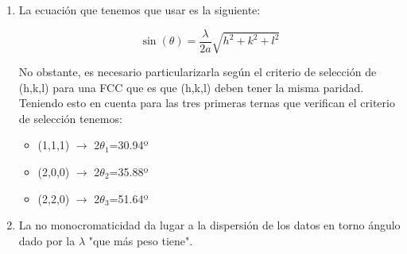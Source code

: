 \begin{enumerate}
	\item La ecuación que tenemos que usar es la siguiente:

	      \begin{equation}
		      \sin(\theta)=\frac{\lambda}{2a}\sqrt{h^2+k^2+l^2}
	      \end{equation}

	      No obstante, es necesario particularizarla según el criterio de selección de (h,k,l) para una FCC que es que (h,k,l) deben tener la misma paridad. Teniendo esto en cuenta para las tres primeras ternas que verifican el criterio de selección tenemos:

	      \begin{itemize}
		      \item (1,1,1) $\longrightarrow$ 2$\theta_1$=30.94º
		      \item (2,0,0) $\longrightarrow$ 2$\theta_2$=35.88º
		      \item (2,2,0) $\longrightarrow$ 2$\theta_3$=51.64º
	      \end{itemize}

	\item La no monocromaticidad da lugar a la dispersión de los datos en torno ángulo dado por la $\lambda$ "que más peso tiene".
\end{enumerate}
